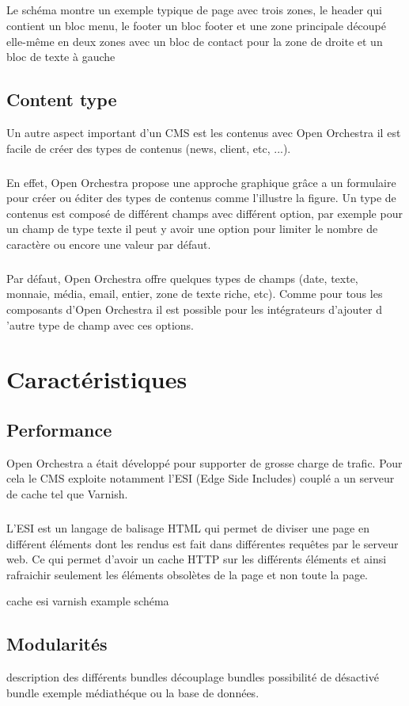          \paragraph{}
		Le schéma montre un exemple typique de page avec trois zones, le header qui contient un bloc menu, le footer un bloc footer et une zone principale découpé elle-même en deux zones avec un bloc de contact pour la zone de droite et un bloc de texte à gauche   
         \section{Content type}
         Un autre aspect important d'un CMS est les contenus avec Open Orchestra il est facile de créer des types de contenus (news, client, etc, ...).
          \paragraph{}
          En effet, Open Orchestra propose une approche graphique grâce a un formulaire pour créer ou éditer des types de contenus comme l'illustre la figure.
          Un type de contenus est composé de différent champs avec différent option, par exemple pour un champ de type texte il peut y avoir une option pour limiter le nombre de caractère ou encore une valeur par défaut.
          \paragraph{}
          Par défaut, Open Orchestra offre quelques types de champs (date, texte, monnaie, média, email, entier, zone de texte riche, etc). Comme pour tous les composants d'Open Orchestra il est possible pour les intégrateurs d'ajouter d 'autre type de champ avec ces options.  
\chapter{Caractéristiques}
   \section{Performance}
   Open Orchestra a était développé pour supporter de grosse charge de trafic. Pour cela le CMS exploite notamment l'ESI (Edge Side Includes) couplé a un serveur de cache tel que Varnish.
   \paragraph{}
   L'ESI est un langage de balisage HTML qui permet de diviser une page en différent éléments dont les rendus est fait dans différentes requêtes par le serveur web. Ce qui permet d'avoir un cache HTTP sur les différents éléments et ainsi rafraichir seulement les éléments obsolètes de la page et non toute la page.
   
   cache esi
   varnish 
   example schéma
   \section{Modularités}
   description des différents bundles
   découplage bundles
   possibilité de désactivé bundle
   exemple médiathéque ou la base de données.
   
        
        
        